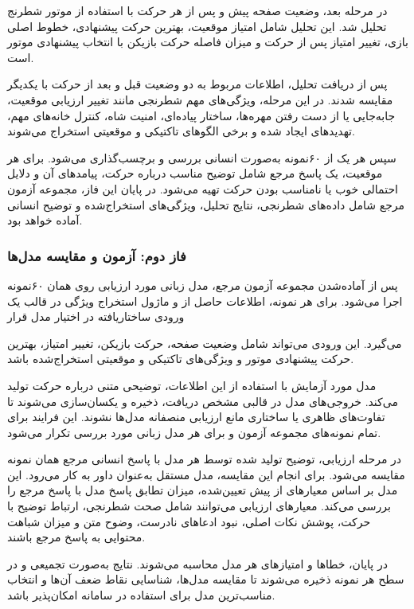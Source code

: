 در مرحله بعد، وضعیت صفحه پیش و پس از هر حرکت با استفاده از موتور شطرنج  تحلیل شد. این تحلیل شامل امتیاز موقعیت، بهترین حرکت پیشنهادی، خطوط اصلی بازی، تغییر امتیاز پس از حرکت و میزان فاصله حرکت بازیکن با انتخاب پیشنهادی موتور است.

پس از دریافت تحلیل، اطلاعات مربوط به دو وضعیت قبل و بعد از حرکت با یکدیگر مقایسه شدند. در این مرحله، ویژگی‌های مهم شطرنجی مانند تغییر ارزیابی موقعیت، جابه‌جایی یا از دست رفتن مهره‌ها، ساختار پیاده‌ای، امنیت شاه، کنترل خانه‌های مهم، تهدیدهای ایجاد شده و برخی الگوهای تاکتیکی و موقعیتی استخراج می‌شوند.

سپس هر یک از  ۶۰نمونه به‌صورت انسانی بررسی و برچسب‌گذاری می‌شود. برای هر موقعیت، یک پاسخ مرجع شامل توضیح مناسب درباره حرکت، پیامدهای آن و دلایل احتمالی خوب یا نامناسب بودن حرکت تهیه می‌شود. در پایان این فاز، مجموعه آزمون مرجع شامل داده‌های شطرنجی، نتایج تحلیل، ویژگی‌های استخراج‌شده و توضیح انسانی آماده خواهد بود.

\subsubsection*{فاز دوم: آزمون و مقایسه مدل‌ها}

پس از آماده‌شدن مجموعه آزمون مرجع، مدل زبانی مورد ارزیابی روی همان  ۶۰نمونه اجرا می‌شود. برای هر نمونه، اطلاعات حاصل از  و ماژول استخراج ویژگی در قالب یک ورودی ساختاریافته در اختیار مدل قرار

می‌گیرد. این ورودی می‌تواند شامل وضعیت صفحه، حرکت بازیکن، تغییر امتیاز، بهترین حرکت پیشنهادی موتور و ویژگی‌های تاکتیکی و موقعیتی استخراج‌شده باشد.

مدل مورد آزمایش با استفاده از این اطلاعات، توضیحی متنی درباره حرکت تولید می‌کند. خروجی‌های مدل در قالبی مشخص دریافت، ذخیره و یکسان‌سازی می‌شوند تا تفاوت‌های ظاهری یا ساختاری مانع ارزیابی منصفانه مدل‌ها نشوند. این فرایند برای تمام نمونه‌های مجموعه آزمون و برای هر مدل زبانی مورد بررسی تکرار می‌شود.

در مرحله ارزیابی، توضیح تولید شده توسط هر مدل با پاسخ انسانی مرجع همان نمونه مقایسه می‌شود. برای انجام این مقایسه، مدل مستقل  به‌عنوان داور به کار می‌رود. این مدل بر اساس معیارهای از پیش تعیین‌شده، میزان تطابق پاسخ مدل با پاسخ مرجع را بررسی می‌کند. معیارهای ارزیابی می‌توانند شامل صحت شطرنجی، ارتباط توضیح با حرکت، پوشش نکات اصلی، نبود ادعاهای نادرست، وضوح متن و میزان شباهت محتوایی به پاسخ مرجع باشند.

در پایان، خطاها و امتیازهای هر مدل محاسبه می‌شوند. نتایج به‌صورت تجمیعی و در سطح هر نمونه ذخیره می‌شوند تا مقایسه مدل‌ها، شناسایی نقاط ضعف آن‌ها و انتخاب مناسب‌ترین مدل برای استفاده در سامانه امکان‌پذیر باشد.

